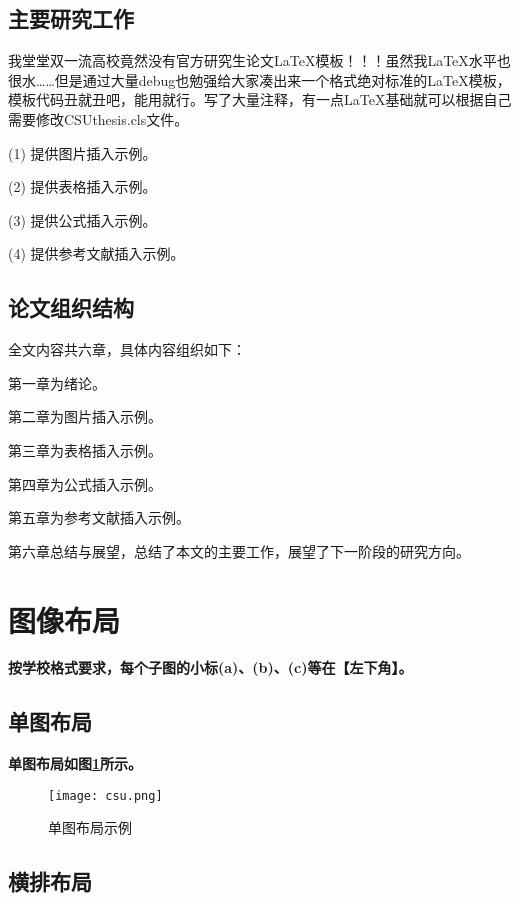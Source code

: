 \subsection{主要研究工作}
我堂堂双一流高校竟然没有官方研究生论文LaTeX模板！！！虽然我LaTeX水平也很水……但是通过大量debug也勉强给大家凑出来一个格式绝对标准的LaTeX模板，模板代码丑就丑吧，能用就行。写了大量注释，有一点LaTeX基础就可以根据自己需要修改CSUthesis.cls文件。

(1) 提供图片插入示例。

(2) 提供表格插入示例。

(3) 提供公式插入示例。

(4) 提供参考文献插入示例。

\subsection{论文组织结构}

全文内容共六章，具体内容组织如下：

第一章为绪论。

第二章为图片插入示例。

第三章为表格插入示例。

第四章为公式插入示例。

第五章为参考文献插入示例。

第六章总结与展望，总结了本文的主要工作，展望了下一阶段的研究方向。

\newpage

\section{图像布局}
\label{sec.figure}
\textbf{按学校格式要求，每个子图的小标(a)、(b)、(c)等在【左下角】。}

\subsection{单图布局}

\lipsum

\textbf{单图布局如图\ref{F.csu_single}所示。}

\begin{figure}[hbt]
\centering
\texttt{[image: csu.png]}
\caption{单图布局示例}
\label{F.csu_single}
\end{figure}

\subsection{横排布局}

